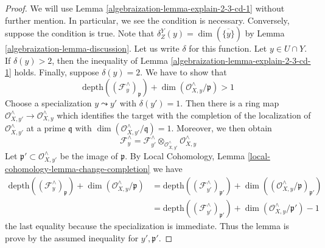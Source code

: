 \begin{proof}

We will use Lemma \ref{algebraization-lemma-explain-2-3-cd-1}
without further mention. In particular, we see the condition is necessary.
Conversely, suppose the condition is true.
Note that $\delta^Y_Z(y) = \dim(\overline{\{y\}})$ by
Lemma \ref{algebraization-lemma-discussion}. Let us write $\delta$ for this function.
Let $y \in U \cap Y$. If $\delta(y) > 2$, then the inequality
of Lemma \ref{algebraization-lemma-explain-2-3-cd-1} holds.
Finally, suppose $\delta(y) = 2$. We have to show that
$$
\text{depth}((\mathcal{F}_y^\wedge)_\mathfrak p) +
\dim(\mathcal{O}_{X, y}^\wedge/\mathfrak p) > 1
$$
Choose a specialization $y \leadsto y'$ with $\delta(y') = 1$. Then
there is a ring map $\mathcal{O}_{X, y'}^\wedge \to \mathcal{O}_{X, y}^\wedge$
which identifies the target with the completion of the localization
of $\mathcal{O}_{X, y'}^\wedge$ at a prime $\mathfrak q$
with $\dim(\mathcal{O}_{X, y'}^\wedge/\mathfrak q) = 1$.
Moreover, we then obtain
$$
\mathcal{F}_y^\wedge =
\mathcal{F}_{y'}^\wedge
\otimes_{\mathcal{O}_{X, y'}^\wedge}
\mathcal{O}_{X, y}^\wedge
$$
Let $\mathfrak p' \subset \mathcal{O}_{X, y'}^\wedge$ be the image
of $\mathfrak p$.
By Local Cohomology, Lemma \ref{local-cohomology-lemma-change-completion}
we have
\begin{align*}
\text{depth}((\mathcal{F}_y^\wedge)_\mathfrak p) +
\dim(\mathcal{O}_{X, y}^\wedge/\mathfrak p)
& =
\text{depth}((\mathcal{F}_{y'}^\wedge)_{\mathfrak p'}) +
\dim((\mathcal{O}_{X, y}^\wedge/\mathfrak p)_{\mathfrak p'}) \\
& =
\text{depth}((\mathcal{F}_{y'}^\wedge)_{\mathfrak p'}) +
\dim(\mathcal{O}_{X, y}^\wedge/\mathfrak p') - 1
\end{align*}
the last equality because the specialization is immediate.
Thus the lemma is prove by the assumed inequality for $y', \mathfrak p'$.
\end{proof}

